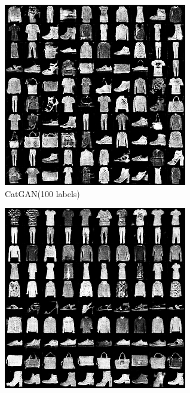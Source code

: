\begin{figure}[hbtp]
  \begin{subfigure}[b]{\trif\textwidth}
    \includegraphics[width=\textwidth]{Img/fa-cg-100labels-new.png}
    \caption{CatGAN(100 labels)}
  \end{subfigure}
  \begin{subfigure}[b]{\trif\textwidth}
    \includegraphics[width=\textwidth]{Img/fa-icg-100labels-new.png}

\end{subfigure}
\end{figure}
